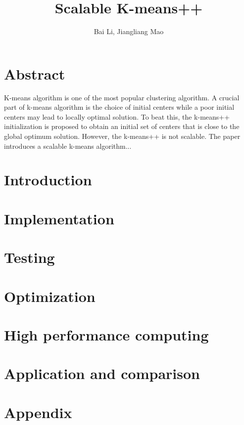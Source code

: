 \documentclass{statsoc}
\title[Short title]{Scalable K-means++}
\author[ {\it et al.}]{Bai Li, Jiangliang Mao}
\begin{document}
  
\section*{Abstract}
K-means algorithm is one of the most popular clustering algorithm. A crucial part of k-means algorithm is the choice of initial centers while a poor initial centers may lead to locally optimal solution. To beat this, the k-means++ initialization is proposed to obtain an initial set of centers that is close to the global optimum solution. However, the k-means++ is not scalable. The paper introduces a scalable k-means algorithm...

  
\section{Introduction}






\section{Implementation}


\section{Testing}

\section{Optimization}

\section{High performance computing}

\section{Application and comparison}
\clearpage
\newpage




\section*{Appendix}
\clearpage
\newpage
\end{document}
